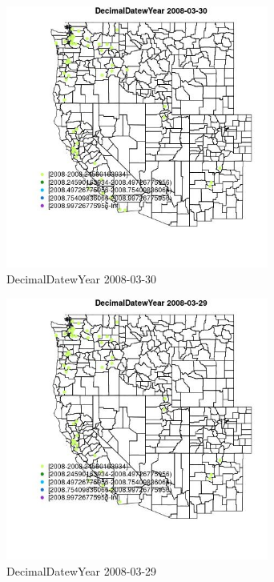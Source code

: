 \begin{figure} 
\centering  
\includegraphics[width=0.77\textwidth]{Code_Outputs/Report_ML_input_PM25_Step4_part_e_de_duplicated_aves_MapObsDecimalDatewYear2008-03-30.jpg} 
\caption{\label{fig:Report_ML_input_PM25_Step4_part_e_de_duplicated_avesMapObsDecimalDatewYear2008-03-30}DecimalDatewYear 2008-03-30} 
\end{figure} 
 

\begin{figure} 
\centering  
\includegraphics[width=0.77\textwidth]{Code_Outputs/Report_ML_input_PM25_Step4_part_e_de_duplicated_aves_MapObsDecimalDatewYear2008-03-29.jpg} 
\caption{\label{fig:Report_ML_input_PM25_Step4_part_e_de_duplicated_avesMapObsDecimalDatewYear2008-03-29}DecimalDatewYear 2008-03-29} 
\end{figure} 
 

